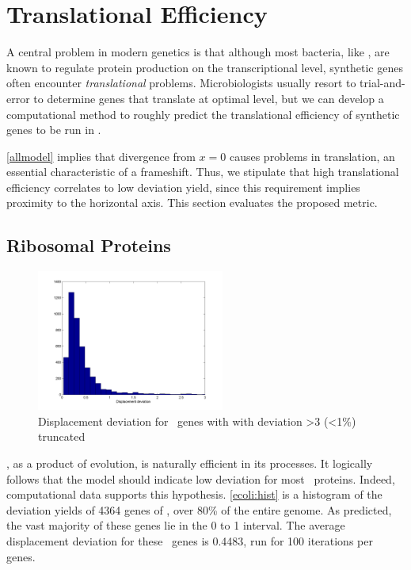 \documentclass[12pt]{article}
\numberwithin{equation}{section}
\begin{document}
\section{Translational Efficiency}


A central problem in modern genetics is that
although most bacteria, like \ecoli, are known to regulate protein production
on the transcriptional level, synthetic genes often encounter \emph{translational}
problems.  Microbiologists usually resort to trial-and-error to determine genes
that translate at optimal level, but we can develop a computational method
to roughly predict the translational efficiency of synthetic genes to
be run in \ecoli.

\autoref{allmodel} implies that divergence from $x=0$ causes
problems in translation, an essential characteristic
of a frameshift.  Thus, we stipulate that high translational efficiency correlates to low deviation yield,
since this requirement implies proximity to the horizontal axis.  This section
evaluates the proposed metric.

\subsection{Ribosomal Proteins}


\begin{figure}
  \centering
  \caption{Displacement deviation for \ecoli\ genes with with
    deviation >3 (<1\%) truncated}
  \label{ecoli:hist}
  \includegraphics[width=0.55\textwidth]{histograms/everything}
\end{figure}

\ecoli, as a product of evolution, is naturally efficient in its
processes.  It logically follows that the model should indicate low deviation
for most \ecoli\ proteins.  Indeed, computational data supports this hypothesis.
\autoref{ecoli:hist} is a histogram of the deviation yields of 4364 genes of
\ecoli, over 80\% of the entire genome.  As predicted, the vast majority
of these genes lie in the 0 to 1 interval.  The average displacement deviation
for these \ecoli\ genes is 0.4483, run for 100 iterations per genes.
\end{document}
